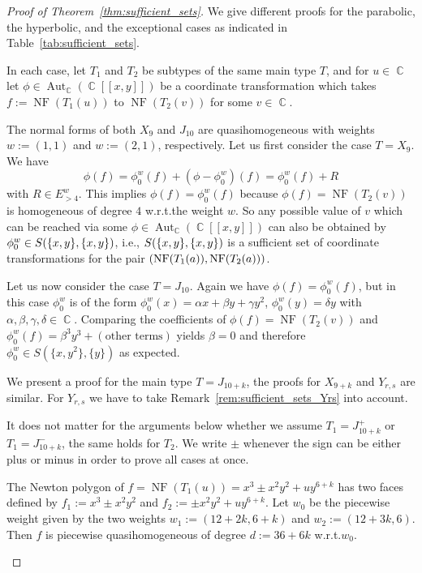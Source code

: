 \documentclass[noend]{amsproc}
\theoremstyle{definition}
\let\originalleft\left
\let\originalright\right
\renewcommand{\left}{\mathopen{}\mathclose\bgroup\originalleft}
\renewcommand{\right}{\aftergroup\egroup\originalright}
\DeclareMathOperator{\C}{\mathbb{C}}
\DeclareMathOperator{\NF}{NF}
\DeclareMathOperator{\Aut}{Aut}
\begin{document}
\begin{proof}[Proof of Theorem~\ref{thm:sufficient_sets}]
We give different proofs for the parabolic, the hyperbolic, and the exceptional
cases as indicated in Table~\ref{tab:sufficient_sets}.

In each case, let $T_1$ and $T_2$ be subtypes of the same main type $T$, and
for $u \in \C$ let $\phi \in \Aut_{\C}(\C[[x,y]])$ be a coordinate
transformation which takes $f := \NF(T_1(u))$ to $\NF(T_2(v))$ for some
$v \in \C$.

\begin{description}[font=\normalfont\itshape,%
leftmargin=0cm,labelindent=\parindent]

\item[Parabolic cases]
The normal forms of both $X_9$ and $J_{10}$ are
quasihomogeneous with weights $w := (1,1)$ and $w := (2,1)$, respectively. Let
us first consider the case $T = X_9$. We have
\[
\phi(f) = \phi_0^w(f)+(\phi-\phi_0^w)(f) = \phi_0^w(f)+R
\]
with $R \in E_{>4}^w$. This implies $\phi(f) = \phi_0^w(f)$ because
$\phi(f) = \NF(T_2(v))$ is homogeneous of degree $4$ w.r.t.\@ the weight $w$.
So any possible value of $v$ which can be reached via some
$\phi \in \Aut_{\C}(\C[[x,y]])$ can also be obtained by
$\phi_0^w \in S\left(\{x,y\}, \{x,y\}\right)$, i.e.\@,
$S\left(\{x,y\}, \{x,y\}\right)$ is a sufficient set of coordinate
transformations for the pair $\left(\NF(T_1(a)), \NF(T_2(a))\right)$.

Let us now consider the case $T = J_{10}$.
Again we have $\phi(f) = \phi_0^w(f)$, but
in this case
$\phi_0^w$ is of the form
$\phi_0^w(x) = \alpha x + \beta y + \gamma y^2$,
$\phi_0^w(y) = \delta y$ with
$\alpha, \beta, \gamma, \delta \in \C$. Comparing the coefficients of
$\phi(f) = \NF(T_2(v))$ and
$\phi_0^w(f) = \beta^3 y^3 + (\text{other terms})$ yields
$\beta = 0$ and therefore $\phi_0^w \in S(\{x, y^2\}, \{y\})$
as expected.

\item[Hyperbolic cases]
We present a proof for the main type $T = J_{10+k}$, the proofs for $X_{9+k}$
and $Y_{r,s}$ are similar. For $Y_{r,s}$ we have to take
Remark~\ref{rem:sufficient_sets_Yrs} into account.

It does not matter for the arguments below whether we assume $T_1 = J_{10+k}^+$
or $T_1 = J_{10+k}^-$, the same holds for $T_2$. We write $\pm$ whenever the
sign can be either plus or minus in order to prove all cases at once.

The Newton polygon of $f = \NF(T_1(u)) = x^3 \pm x^2 y^2 + uy^{6+k}$ has two
faces defined by $f_1 := x^3 \pm x^2 y^2$ and $f_2 := \pm x^2 y^2 + uy^{6+k}$.
Let $w_0$ be the piecewise weight given by the two weights
$w_1 := (12+2k, 6+k)$ and $w_2 := (12+3k, 6)$. Then $f$ is piecewise
quasihomogeneous of degree $d := 36+6k$ w.r.t.\@ $w_0$.


\end{description}
\end{proof}
\end{document}

